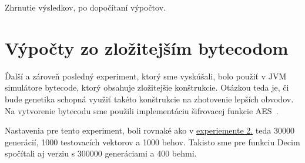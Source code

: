 Zhrnutie výsledkov, po dopočítaní výpočtov.

\section{Výpočty zo zložitejším bytecodom}
\label{sec:exp3}

Ďalší a zároveň posledný experiment, ktorý sme vyskúšali, bolo použiť v JVM simulátore bytecode, ktorý obsahuje zložitejšie konštrukcie. Otázkou teda je, či bude genetika schopná využiť takéto konštrukcie na zhotovenie lepších obvodov. Na vytvorenie bytecodu sme použili implementáciu šifrovacej funkcie AES~\parencite{AES-FIPS}.


Nastavenia pre tento experiment, boli rovnaké ako v \hyperref[sec:exp2]{experiemente 2.} teda 30000 generácií, 1000 testovacích vektorov a 1000 behov. Takisto sme pre funkciu Decim spočítali aj verziu s 300000 generáciami a 400 behmi. 
